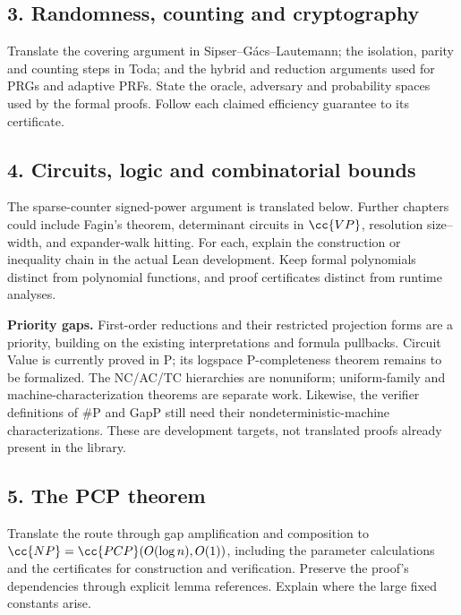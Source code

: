 \clearpage
\subsection*{3. Randomness, counting and cryptography}
Translate the covering argument in Sipser--G\'acs--Lautemann; the isolation, parity and
counting steps in Toda; and the hybrid and reduction arguments used for PRGs and
adaptive PRFs. State the oracle, adversary and probability spaces used by the formal
proofs. Follow each claimed efficiency guarantee to its certificate.

\subsection*{4. Circuits, logic and combinatorial bounds}
The sparse-counter signed-power argument is translated below. Further chapters could
include Fagin's theorem, determinant circuits in $\cc{VP}$,
resolution size--width, and expander-walk hitting. For each, explain the construction or
inequality chain in the actual Lean development. Keep formal polynomials distinct from
polynomial functions, and proof certificates distinct from runtime analyses.

\textbf{Priority gaps.}
First-order reductions and their restricted projection forms are a priority, building
on the existing interpretations and formula pullbacks. Circuit Value is currently proved
in P; its logspace P-completeness theorem remains to be formalized. The NC/AC/TC
hierarchies are nonuniform; uniform-family and machine-characterization theorems are
separate work. Likewise, the verifier definitions of \#P and GapP still need their
nondeterministic-machine characterizations. These are development targets, not translated
proofs already present in the library.

\subsection*{5. The PCP theorem}
Translate the route through gap amplification and composition to
$\cc{NP}=\cc{PCP}(O(\log n),O(1))$, including the parameter calculations and the
certificates for construction and verification. Preserve the proof's dependencies
through explicit lemma references. Explain where the large fixed constants arise.

